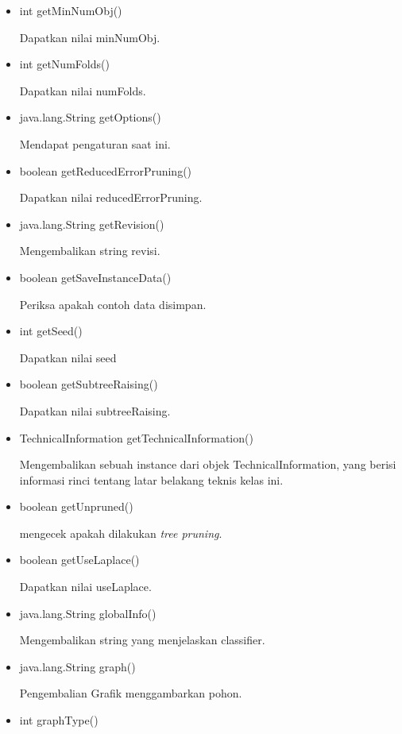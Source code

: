 \begin{itemize}
	\item int getMinNumObj()
	
	Dapatkan nilai minNumObj.
	
	\item int getNumFolds()
	
	Dapatkan nilai numFolds.
	
	\item java.lang.String getOptions()
	
	Mendapat pengaturan saat ini.
	
	\item boolean getReducedErrorPruning()
	
	Dapatkan nilai reducedErrorPruning.
	
	\item java.lang.String getRevision()
	
	Mengembalikan string revisi.
	
	\item boolean getSaveInstanceData()
	
	Periksa apakah contoh data disimpan.
	
	\item int getSeed()
	
	Dapatkan nilai seed
	
	\item boolean getSubtreeRaising()
	
	Dapatkan nilai subtreeRaising.
	
	\item TechnicalInformation getTechnicalInformation()
	
	Mengembalikan sebuah instance dari objek TechnicalInformation, yang berisi informasi rinci tentang latar belakang teknis kelas ini.

	\item boolean getUnpruned()
	
	mengecek apakah dilakukan \textsl{tree pruning}.
	
	\item boolean getUseLaplace()
	
	Dapatkan nilai useLaplace.
	
	\item java.lang.String globalInfo()
	
	Mengembalikan string yang menjelaskan classifier.
	
	\item java.lang.String graph()
	
	Pengembalian Grafik menggambarkan pohon.
	
	\item int graphType()
	

\end{itemize}
